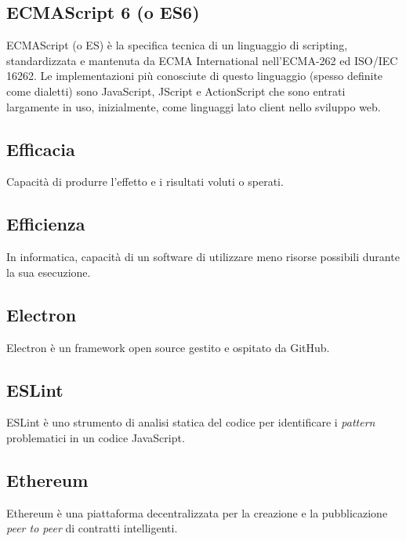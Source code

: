 
\subsection*{ECMAScript 6 (o ES6)}
ECMAScript (o ES) è la specifica tecnica di un linguaggio di scripting, standardizzata e mantenuta da ECMA International nell'ECMA-262 ed ISO/IEC 16262.
Le implementazioni più conosciute di questo linguaggio (spesso definite come dialetti) sono JavaScript, JScript e ActionScript che sono entrati largamente in uso, inizialmente, come linguaggi lato client nello sviluppo web. 

\subsection*{Efficacia}
Capacità di produrre l'effetto e i risultati voluti o sperati.

\subsection*{Efficienza}
In informatica, capacità di un software di utilizzare meno risorse possibili durante la sua esecuzione.

\subsection*{Electron}
Electron è un framework open source gestito e ospitato da GitHub.

\subsection*{ESLint}
ESLint è uno strumento di analisi statica del codice per identificare i \textit{pattern} problematici in un codice JavaScript.

\subsection*{Ethereum}
Ethereum è una piattaforma decentralizzata per la creazione e la pubblicazione \textit{peer to peer} di contratti intelligenti.


